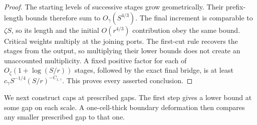 \begin{proof}
The starting levels of successive stages grow geometrically.
Their prefix-length bounds therefore sum to \(O_\gamma(S^{4/3})\).
The final increment is comparable to \(\zeta S\), so its length and
the initial \(O(r^{4/3})\) contribution obey the same bound.
Critical weights multiply at the joining ports. The first-cut rule
recovers the stages from the output, so multiplying their lower bounds
does not create an unaccounted multiplicity. A fixed positive factor
for each of \(O_\zeta(1+\log(S/r))\) stages, followed by the exact
final bridge, is at least
\(c_\gamma S^{-1/4}(S/r)^{-C_{1,\gamma}}\).
This proves every asserted conclusion.
\end{proof}

We next construct caps at prescribed gaps.  The first step gives a
lower bound at some gap on each scale.  A one-cell-thick boundary
deformation then compares any smaller prescribed gap to that one.


